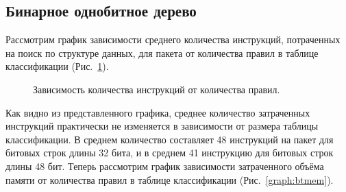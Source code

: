 \documentclass[9pt,a4paper]{article}
\begin{document}
        \subsection{Бинарное однобитное дерево}
            Рассмотрим график зависимости среднего количества инструкций, потраченных на поиск по структуре данных, для пакета от количества правил в таблице классификации (Рис.~\ref{graph:btinst}).
            \begin{figure}[!htbp]
                \centering
                \captionsetup{justification=centering}
                \caption{Зависимость количества инструкций от количества правил.}
                \label{graph:btinst}
            \end{figure}
            Как видно из представленного графика, среднее количество затраченных инструкций практически не изменяется в зависимости от размера таблицы классификации. 
            В среднем количество составляет 48 инструкций на пакет для битовых строк длины 32 бита, и в среднем 41 инструкцию для битовых строк длины 48 бит.
            Теперь рассмотрим график зависимости затраченного объёма памяти от количества правил в таблице классификации (Рис.~\ref{graph:btmem}).
\end{document}
